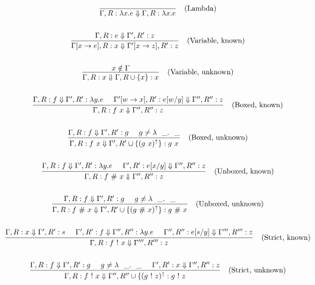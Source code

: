 \documentclass[a4paper]{article}
\begin{document}
\begin{gather*}
  \infer
      [\text{(Lambda)}]
      {\Gamma, R : \lambda x. e \reduces \Gamma, R : \lambda x. e}
      {}
      \\
      \\
  \infer
      [\text{(Variable, known)}]
      {\Gamma[x \to e], R : x \reduces \Gamma'[x \to z], R' : z}
      {\Gamma, R : e \reduces \Gamma', R' : z}
      \\
      \\
  \infer
      [\text{(Variable, unknown)}]
      {\Gamma, R : x \reduces \Gamma, R \cup \{x\} : x}
      {x \notin \Gamma}
      \\
      \\
  \infer
      [\text{(Boxed, known)}]
      {\Gamma,R : f \app x \reduces \Gamma'',R'' : z}
      {\Gamma,R : f \reduces \Gamma',R' : \lambda y. e \;\;\;\;\; \Gamma'[w \to x],R' : e[w/y] \reduces \Gamma'',R'' : z}
      \\
      \\
  \infer
      [\text{(Boxed, unknown)}]
      {\Gamma,R : f \app x \reduces \Gamma',R' \cup \{\uppity{(g \app x)}\} : g \app x}
      {\Gamma,R : f \reduces \Gamma',R' : g \;\;\;\;\; g \neq \lambda \_.\_}
      \\
      \\
  \infer
      [\text{(Unboxed, known)}]
      {\Gamma,R : f \unboxed x \reduces \Gamma'',R'' : z}
      {\Gamma,R : f \reduces \Gamma',R' : \lambda y. e \;\;\;\;\; \Gamma',R' : e[x/y] \reduces \Gamma'',R'' : z}
      \\
      \\
      \infer
      [\text{(Unboxed, unknown)}]
      {\Gamma,R : f \unboxed x \reduces \Gamma',R' \cup \{\uppity{(g \unboxed x)}\} : g \unboxed x}
      {\Gamma,R : f \reduces \Gamma',R' : g \;\;\;\;\; g \neq \lambda \_.\_}
      \\
      \\
  \infer
      [\text{(Strict, known)}]
      {\Gamma, R : f \strict x \reduces \Gamma''', R''' : z}
      {\Gamma, R : x \reduces \Gamma', R' : s \;\;\;\;\; \Gamma', R' : f \reduces \Gamma'', R'' : \lambda y. e \;\;\;\;\; \Gamma'', R'' : e[s/y] \reduces \Gamma''', R''' : z}
      \\
      \\
  \infer
      [\text{(Strict, unknown)}]
      {\Gamma, R : f \strict x \reduces \Gamma'', R'' \cup \{\uppity{(g \strict z)}: g \strict z}
      {\Gamma,R : f \reduces \Gamma',R' : g \;\;\;\;\; g \neq \lambda \_.\_ \;\;\;\;\; \Gamma', R' : x \reduces \Gamma'', R'' : z}
      \\
      \\
\end{gather*}
\end{document}
